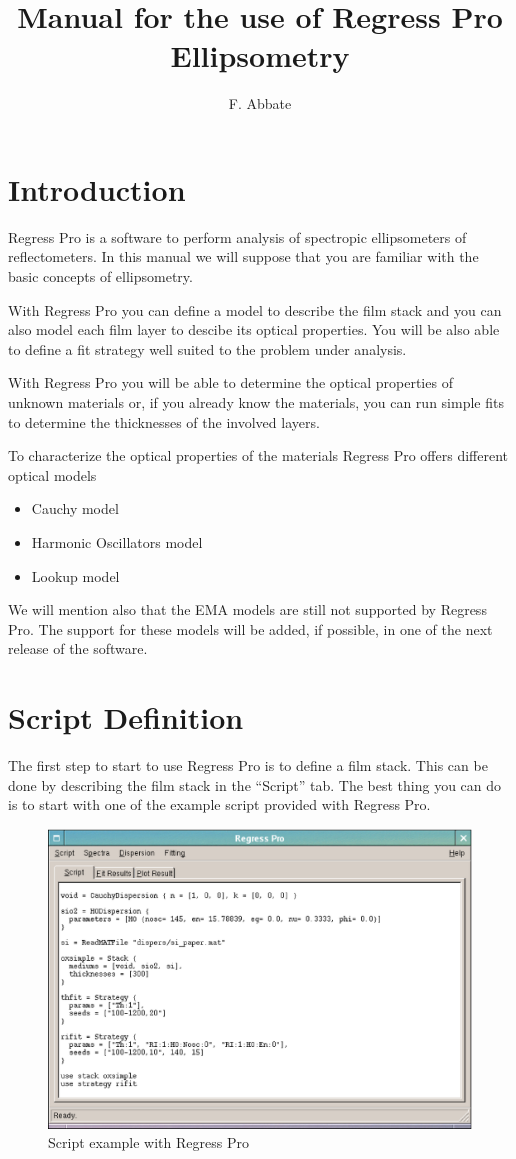 \documentclass[a4paper]{report}
\begin{document}
\title{Manual for the use of Regress Pro Ellipsometry}
\author{F. Abbate}
\maketitle
\chapter{Introduction}
Regress Pro is a software to perform analysis of spectropic
ellipsometers of reflectometers. In this manual we will suppose that
you are familiar with the basic concepts of ellipsometry.

With Regress Pro you can define a model to describe the film stack and
you can also model each film layer to descibe its optical
properties. You will be also able to define a fit strategy well suited
to the problem under analysis.

With Regress Pro you will be able to determine the optical properties
of unknown materials or, if you already know the materials, you can
run simple fits to determine the thicknesses of the involved layers.

To characterize the optical properties of the materials Regress Pro
offers different optical models
\begin{itemize}
  \item Cauchy model
  \item Harmonic Oscillators model
  \item Lookup model
\end{itemize}
We will mention also that the EMA models are still not supported by
Regress Pro. The support for these models will be added, if possible,
in one of the next release of the software.

\chapter{Script Definition}
The first step to start to use Regress Pro is to define a film
stack. This can be done by describing the film stack in the ``Script''
tab. The best thing you can do is to start with one of the example
script provided with Regress Pro.
\begin{figure}[!thp]
  \includegraphics[width=\textwidth]{figure/script-window.eps}
  \caption{Script example with Regress Pro}
\end{figure}
\end{document}
